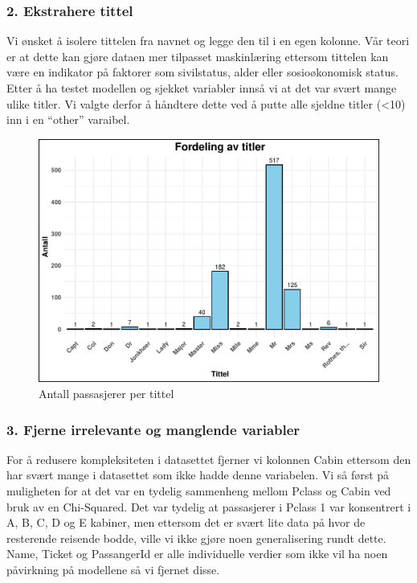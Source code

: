 \documentclass[
]{article}
\begin{document}
\subsubsection{2. Ekstrahere tittel}\label{ekstrahere-tittel}

Vi ønsket å isolere tittelen fra navnet og legge den til i en egen
kolonne. Vår teori er at dette kan gjøre dataen mer tilpasset
maskinlæring ettersom tittelen kan være en indikator på faktorer som
sivilstatus, alder eller sosioøkonomisk status. Etter å ha testet
modellen og sjekket variabler innså vi at det var svært mange ulike
titler. Vi valgte derfor å håndtere dette ved å putte alle sjeldne
titler (\textless10) inn i en ``other'' varaibel.

\begin{figure}[H]

{\centering \includegraphics[width=0.8\linewidth]{presentation_files/figure-latex/unnamed-chunk-6-1} 

}

\caption{Antall passasjerer per tittel}\label{fig:unnamed-chunk-6}
\end{figure}

\subsubsection{3. Fjerne irrelevante og manglende
variabler}\label{fjerne-irrelevante-og-manglende-variabler}

For å redusere kompleksiteten i datasettet fjerner vi kolonnen Cabin
ettersom den har svært mange i datasettet som ikke hadde denne
variabelen. Vi så først på muligheten for at det var en tydelig
sammenheng mellom Pclass og Cabin ved bruk av en Chi-Squared. Det var
tydelig at passasjerer i Pclass 1 var konsentrert i A, B, C, D og E
kabiner, men ettersom det er svært lite data på hvor de resterende
reisende bodde, ville vi ikke gjøre noen generalisering rundt dette.
Name, Ticket og PassangerId er alle individuelle verdier som ikke vil ha
noen påvirkning på modellene så vi fjernet disse.
\end{document}
